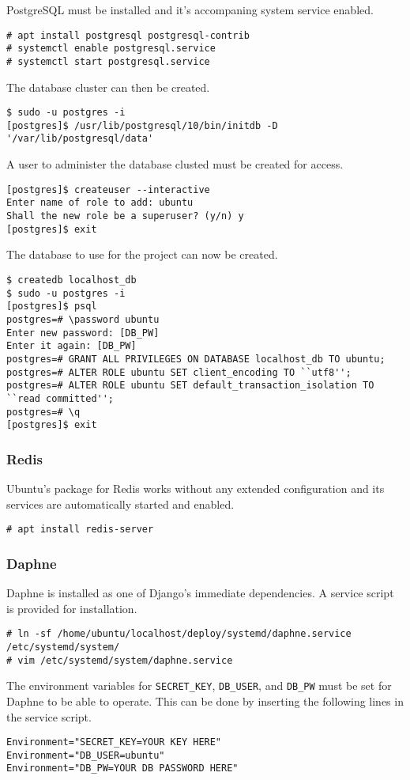 PostgreSQL must be installed and it's accompaning system service enabled.
\begin{lstlisting}
# apt install postgresql postgresql-contrib
# systemctl enable postgresql.service
# systemctl start postgresql.service
\end{lstlisting}
The database cluster can then be created.
\begin{lstlisting}
$ sudo -u postgres -i
[postgres]$ /usr/lib/postgresql/10/bin/initdb -D '/var/lib/postgresql/data'
\end{lstlisting}
A user to administer the database clusted must be created for access.
\begin{lstlisting}
[postgres]$ createuser --interactive
Enter name of role to add: ubuntu
Shall the new role be a superuser? (y/n) y
[postgres]$ exit
\end{lstlisting}
The database to use for the project can now be created.
\begin{lstlisting}
$ createdb localhost_db
$ sudo -u postgres -i
[postgres]$ psql
postgres=# \password ubuntu
Enter new password: [DB_PW]
Enter it again: [DB_PW]
postgres=# GRANT ALL PRIVILEGES ON DATABASE localhost_db TO ubuntu;
postgres=# ALTER ROLE ubuntu SET client_encoding TO ``utf8'';
postgres=# ALTER ROLE ubuntu SET default_transaction_isolation TO ``read committed'';
postgres=# \q
[postgres]$ exit
\end{lstlisting}

\subsubsection{Redis}

Ubuntu's package for Redis works without any extended configuration and its
services are automatically started and enabled.
\begin{lstlisting}
# apt install redis-server
\end{lstlisting}

\subsubsection{Daphne}

Daphne is installed as one of Django's immediate dependencies.
A service script is provided for installation.
\begin{lstlisting}
# ln -sf /home/ubuntu/localhost/deploy/systemd/daphne.service /etc/systemd/system/
# vim /etc/systemd/system/daphne.service
\end{lstlisting}
The environment variables for \lstinline{SECRET_KEY}, \lstinline{DB_USER}, and
\lstinline{DB_PW} must be set for Daphne to be able to operate. This
can be done by inserting the following lines in the service script.
\begin{lstlisting}
Environment="SECRET_KEY=YOUR KEY HERE"
Environment="DB_USER=ubuntu"
Environment="DB_PW=YOUR DB PASSWORD HERE"
\end{lstlisting}

